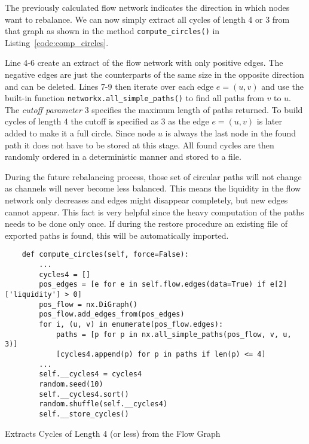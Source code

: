 \documentclass[final]{fhnwreport}       %
\begin{document}
The previously calculated flow network indicates the direction in which nodes want to rebalance. We can now simply extract all cycles of length 4 or 3 from that graph as shown in the method \texttt{compute_circles()} in Listing~\ref{code:comp_circles}. 

Line 4-6 create an extract of the flow network with only positive edges. The negative edges are just the counterparts of the same size in the opposite direction and can be deleted. Lines 7-9 then iterate over each edge $e = (u, v)$ and use the built-in function \texttt{networkx.all_simple_paths()} to find all paths from $v$ to $u$. The \emph{cutoff parameter} 3 specifies the maximum length of paths returned. To build cycles of length 4 the cutoff is specified as 3 as the edge $e = (u, v)$ is later added to make it a full circle. Since node $u$ is always the last node in the found path it does not have to be stored at this stage. All found cycles are then randomly ordered in a deterministic manner and stored to a file. 

During the future rebalancing process, those set of circular paths will not change as channels will never become less balanced. This means the liquidity in the flow network only decreases and edges might disappear completely, but new edges cannot appear. This fact is very helpful since the heavy computation of the paths needs to be done only once. If during the restore procedure an existing file of exported paths is found, this will be automatically imported.

\begin{listing}[H]
  \begin{verbatim}
    def compute_circles(self, force=False):
        ...
        cycles4 = []
        pos_edges = [e for e in self.flow.edges(data=True) if e[2]['liquidity'] > 0]
        pos_flow = nx.DiGraph()
        pos_flow.add_edges_from(pos_edges)
        for i, (u, v) in enumerate(pos_flow.edges):
            paths = [p for p in nx.all_simple_paths(pos_flow, v, u, 3)]
            [cycles4.append(p) for p in paths if len(p) <= 4]
        ...
        self.__cycles4 = cycles4
        random.seed(10)
        self.__cycles4.sort()
        random.shuffle(self.__cycles4)
        self.__store_cycles()
  \end{verbatim}
  \caption{Extracts Cycles of Length 4 (or less) from the Flow Graph}
  \label{code:comp_circles}
\end{listing}
\end{document}
